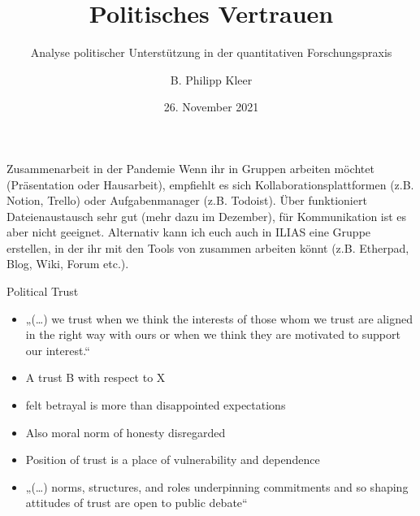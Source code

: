 \documentclass[11pt]{beamer}
\title{Politisches Vertrauen}
\subtitle{Analyse politischer Unterstützung in der quantitativen Forschungspraxis}
\date{26. November 2021}
\author{B. Philipp Kleer}
\institute{Institut für Politikwissenschaft | Justus-Liebig-Universität Gießen}
\begin{document}
\begin{frame}
\titlepage
\end{frame}

\begin{frame}[t]{Zusammenarbeit in der Pandemie}
Wenn ihr in Gruppen arbeiten möchtet (Präsentation oder Hausarbeit), empfiehlt es sich Kollaborationsplattformen (z.B. Notion, Trello) oder Aufgabenmanager (z.B. Todoist). Über  funktioniert Dateienaustausch sehr gut (mehr dazu im Dezember), für Kommunikation ist es aber nicht geeignet. Alternativ kann ich euch auch in ILIAS eine Gruppe erstellen, in der ihr mit den Tools von  zusammen arbeiten könnt (z.B. Etherpad, Blog, Wiki, Forum etc.).

\end{frame}

\begin{frame}[t]{Political Trust}
\begin{itemize}
	\item „(…) we trust when we think the interests of those whom we trust are aligned in the right way with ours or when we think they are motivated to support our interest.“ \parencite[447]{Festenstein2019}
	\item A trust B with respect to X \parencite[449]{Festenstein2019}
	\item felt betrayal is more than disappointed expectations \parencite[450]{Festenstein2019}
	\item Also moral norm of honesty disregarded
	\item Position of trust is a place of vulnerability and dependence \parencite[451]{Festenstein2019}
	\item „(…) norms, structures, and roles underpinning commitments and so shaping attitudes of trust are open to public debate“ \parencite[454]{Festenstein2019}
	\end{itemize}

\end{frame}
\end{document}
